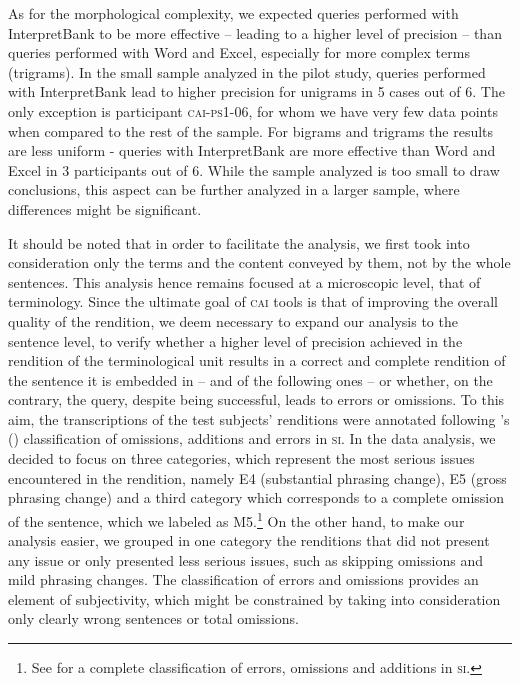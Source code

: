 \documentclass[output=paper]{langsci/langscibook}
\begin{document}
As for the morphological complexity, we expected queries performed with InterpretBank to be more effective – leading to a higher level of precision – than queries performed with Word and Excel, especially for more complex terms (trigrams). In the small sample analyzed in the pilot study, queries performed with InterpretBank lead to higher precision for unigrams in 5 cases out of 6. The only exception is participant \textsc{cai}-\textsc{ps1-06}, for whom we have very few data points when compared to the rest of the sample. For bigrams and trigrams the results are less uniform - queries with InterpretBank are more effective than Word and Excel in 3 participants out of 6. While the sample analyzed is too small to draw conclusions, this aspect can be further analyzed in a larger sample, where differences might be significant.

It should be noted that in order to facilitate the analysis, we first took into consideration only the terms and the content conveyed by them, not by the whole sentences. This analysis hence remains focused at a microscopic level, that of terminology. Since the ultimate goal of \textsc{cai} tools is that of improving the overall quality of the rendition, we deem necessary to expand our analysis to the sentence level, to verify whether a higher level of precision achieved in the rendition of the terminological unit results in a correct and complete rendition of the sentence it is embedded in – and of the following ones – or whether, on the contrary, the query, despite being successful, leads to errors or omissions. To this aim, the transcriptions of the test subjects’ renditions were annotated following \citeauthor{Barik1971}’s (\citeyear{Barik1971}) classification of omissions, additions and errors in \textsc{si}. In the data analysis, we decided to focus on three categories, which represent the most serious issues encountered in the rendition, namely E4 (substantial phrasing change), E5 (gross phrasing change) and a third category which corresponds to a complete omission of the sentence, which we labeled as M5.\footnote{See \citet{Barik1971} for a complete classification of errors, omissions and additions in \textsc{si}.} On the other hand, to make our analysis easier, we grouped in one category the renditions that did not present any issue or only presented less serious issues, such as skipping omissions and mild phrasing changes. The classification of errors and omissions provides an element of subjectivity, which might be constrained by taking into consideration only clearly wrong sentences or total omissions.
\end{document}
